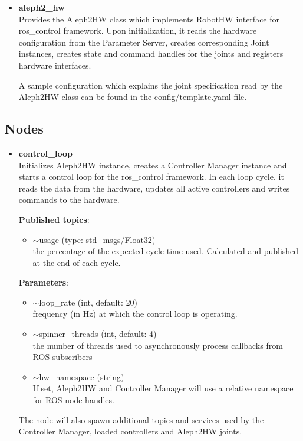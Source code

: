 \documentclass[english,inz,shortabstract]{iithesis}
\newcommand{\val}[1]{\textbf{\textsf{#1}}}
\begin{document}
\begin{itemize}
		\item \val{aleph2\_hw}\\
		Provides the \textsf{Aleph2HW} class which implements \textsf{RobotHW} interface for \textsf{ros\_control} framework. Upon initialization, it reads the hardware configuration from the Parameter Server, creates corresponding \textsf{Joint} instances, creates state and command handles for the joints and registers hardware interfaces.

		A sample configuration which explains the joint specification read by the \textsf{Aleph2HW} class can be found in the \textsf{config/template.yaml} file.

	\end{itemize}

\subsection{Nodes}

	\begin{itemize}
		\item \val{control\_loop}\\
		Initializes \textsf{Aleph2HW} instance, creates a Controller Manager instance and starts a control loop for the \textsf{ros\_control} framework. In each loop cycle, it reads the data from the hardware, updates all active controllers and writes commands to the hardware.

		\textbf{Published topics}:
		\begin{itemize}[itemsep=0pt, parsep=2pt, topsep=0pt]
			\item \textsf{$\sim$usage} (type: \textsf{std\_msgs/Float32})\\
			the percentage of the expected cycle time used. Calculated and published at the end of each cycle.
		\end{itemize}

		\textbf{Parameters}:
		\begin{itemize}[itemsep=0pt, parsep=2pt, topsep=0pt]
			\item \textsf{$\sim$loop\_rate} (\textsf{int}, default: \textsf{20})\\
			frequency (in Hz) at which the control loop is operating.
			\item \textsf{$\sim$spinner\_threads} (\textsf{int}, default: \textsf{4})\\
			the number of threads used to asynchronously process callbacks from ROS subscribers
			\item \textsf{$\sim$hw\_namespace} (\textsf{string})\\
			If set, Aleph2HW and Controller Manager will use a relative namespace for ROS node handles.
		\end{itemize}

		The node will also spawn additional topics and services used by the Controller Manager, loaded controllers and \textsf{Aleph2HW} joints.
	\end{itemize}
\end{document}
